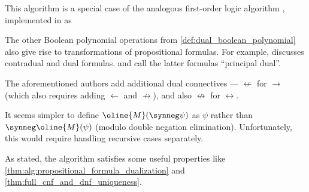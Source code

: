 \begin{comments}
  \item This algorithm is a special case of the analogous first-order logic algorithm , implemented in \cite{notebook:code} as
  \begin{CodeRefDisplay}
  \end{CodeRefDisplay}

  \item The other Boolean polynomial operations from \cref{def:dual_boolean_polynomial} also give rise to transformations of propositional formulas. For example, \textcite{Gottschalk1953Quaternality} discusses contradual and dual formulas. \Textcite[114]{Church1956LogicVol1} and \textcite[192]{Andrews2002Logic} call the latter formulas \enquote{principal dual}.

  The aforementioned authors add additional dual connectives --- \( \nleftarrow \) for \( \rightarrow \) (which also requires adding \( \leftarrow \) and \( \nrightarrow \)), and also \( \nleftrightarrow \) for \( \leftrightarrow \).

  \item It seems simpler to define \( \oline{M}(\synneg \psi) \) as \( \psi \) rather than \( \synneg \oline{M}(\psi) \) (modulo double negation elimination). Unfortunately, this would require handling recursive cases separately.

  \item As stated, the algorithm satisfies some useful properties like \cref{thm:alg:propositional_formula_dualization} and \cref{thm:full_cnf_and_dnf_uniqueness}.
\end{comments}

